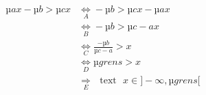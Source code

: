 \begin{align}
µ{a}x-µ{b}>µ{c}x & \underset{A}\Leftrightarrow -µ{b}>µ{c}x-µ{a}x\\
& \underset{B}\Leftrightarrow -µ{b}>µ{c-a}x \\ 
& \underset{C}\Leftrightarrow \frac{-µ{b}}{µ{c-a}}>x \\
& \underset{D}\Leftrightarrow µ{grens}>x\\
  & \underset{E}\Rightarrow \text{ {text} } x \in ]-\infty,µ{grens}[
\end{align}
